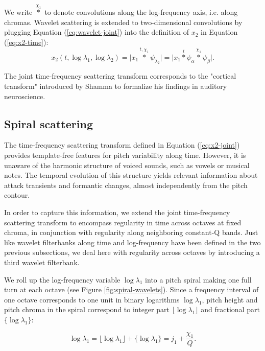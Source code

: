 \documentclass[twoside,a4paper]{article}
\begin{document}
We write $\overset{\chi_{1}}{\ast}$ to denote convolutions along the log-frequency axis, i.e. along chromas.  Wavelet scattering is extended to two-dimensional convolutions by plugging Equation (\ref{eq:wavelet-joint}) into the definition of $x_2$ in Equation (\ref{eq:x2-time}):
\begin{equation}
x_{2}(t,\log \lambda_{1},\log \lambda_{2}) =
\vert x_{1} \overset{t, \chi_{1}}{\ast} \psi_{\lambda_{2}} \vert =
\vert x_{1} \overset{t}{\ast} \psi_{\alpha} \overset{\chi_{1}}{\ast} \psi_{\beta} \vert.
\label{eq:x2-joint}
\end{equation}

The joint time-frequency scattering transform corresponds to the "cortical transform" introduced by Shamma to formalize his findings in auditory neuroscience.



\subsection{Spiral scattering}

The time-frequency scattering transform defined in Equation (\ref{eq:x2-joint}) provides template-free features for pitch variability along time. However, it is unaware of the harmonic structure of voiced sounds, such as vowels or musical notes. The temporal evolution of this structure yields relevant information about attack transients and formantic changes, almost independently from the pitch contour.

In order to capture this information, we extend the joint time-frequency scattering transform to encompass regularity in time across octaves at fixed chroma, in conjunction with regularity along neighboring constant-Q bands. Just like wavelet filterbanks along time and log-frequency have been defined in the two previous subsections, we deal here with regularity across octaves by introducing a third wavelet filterbank.

We roll up the log-frequency variable $\log \lambda_1$ into a pitch spiral making one full turn at each octave (see Figure \ref{fig:spiral-wavelets}). Since a frequency interval of one octave corresponds to one unit in binary logarithms $\log \lambda_1$, pitch height and pitch chroma in the spiral correspond to integer part $\lfloor \log \lambda_1 \rfloor$ and fractional part $\{ \log \lambda_1 \}$:

\begin{equation}
\log \lambda_1 = \lfloor \log \lambda_1 \rfloor + \{ \log \lambda_1 \} = j_1 + \frac{\chi_1}{Q}.
\label{eq:integer-part and fractional part}
\end{equation}
\end{document}
